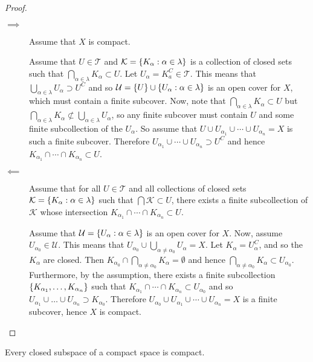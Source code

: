 \documentclass[letterpaper,12pt,fleqn]{article}
\newcommand{\U}{\mathcal{U}}
\renewcommand{\a}{\alpha}
\renewcommand{\l}{\lambda}
\newcommand{\T}{\mathscr{T}}
\newcommand{\K}{\mathcal{K}}
\begin{document}
\begin{proof}
  \begin{description}
  \item[]
  \item[\(\implies\)] Assume that \(X\) is compact.

    Assume that \(U\in\T\) and \(\K=\set{K_{\a}:\a\in\l}\) is a collection of closed sets such that
    \(\bigcap_{\a\in\l}K_{\a}\subset U\).  Let \(U_{\a}=K_{a}^C\in\T\).  This means that
    \(\bigcup_{\a\in\l}U_{\a}\supset U^C\) and so \(\U=\set{U}\cup\set{U_{\a}:\a\in\l}\) is an open cover for \(X\),
    which must contain a finite subcover.  Now, note that \(\bigcap_{\a\in\l}K_{\a}\subset U\) but
    \(\bigcap_{\a\in\l}K_{\a}\not\subset\bigcup_{\a\in\l}U_{\a}\), so any finite subcover must contain \(U\) and some
    finite subcollection of the \(U_{\a}\).  So assume that \(U\cup U_{\a_1}\cup\cdots\cup U_{\a_n}=X\) is such a
    finite subcover.  Therefore \(U_{\a_1}\cup\cdots\cup U_{\a_n}\supset U^C\) and hence
    \(K_{\a_1}\cap\cdots\cap K_{\a_n}\subset U\).

  \item[\(\impliedby\)] Assume that for all \(U\in\T\) and all collections of closed sets \(\K=\set{K_{\a}:\a\in\l}\)
    such that \(\bigcap\K\subset U\), there exists a finite subcollection of \(\K\) whose intersection
    \(K_{\a_1}\cap\cdots\cap K_{\a_n}\subset U\).

    Assume that \(\U=\set{U_{\a}:\a\in\l}\) is an open cover for \(X\).  Now, assume \(U_{\a_0}\in\U\).  This means
    that \(U_{\a_0}\cup\bigcup_{\a\ne\a_0}U_{\a}=X\).  Let \(K_{\a}=U_{\a}^C\), and so the \(K_{\a}\) are closed.  Then
    \(K_{\a_0}\cap\bigcap_{\a\ne\a_0}K_{\a}=\emptyset\) and hence \(\bigcap_{\a\ne\a_0}K_{\a}\subset U_{\a_0}\).
    Furthermore, by the assumption, there exists a finite subcollection \(\set{K_{\a_1},\ldots,K_{\a_n}}\) such that
    \(K_{\a_1}\cap\cdots\cap K_{\a_n}\subset U_{\a_0}\) and so \(U_{\a_1}\cup\ldots\cup U_{\a_n}\supset K_{\a_0}\).
    Therefore \(U_{\a_0}\cup U_{\a_1}\cup\cdots\cup U_{\a_n}=X\) is a finite subcover, hence \(X\) is compact.
  \end{description}
\end{proof}

\begin{theorem}
  Every closed subspace of a compact space is compact.
\end{theorem}
\end{document}
